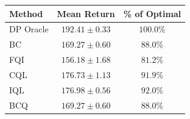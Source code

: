 \begin{tabular}{lcc}
\hline
Method & Mean Return & \% of Optimal \\
\hline
DP Oracle & $192.41 \pm 0.33$ & $100.0\%$ \\
BC & $169.27 \pm 0.60$ & $88.0\%$ \\
FQI & $156.18 \pm 1.68$ & $81.2\%$ \\
CQL & $176.73 \pm 1.13$ & $91.9\%$ \\
IQL & $176.98 \pm 0.56$ & $92.0\%$ \\
BCQ & $169.27 \pm 0.60$ & $88.0\%$ \\
\hline
\end{tabular}
